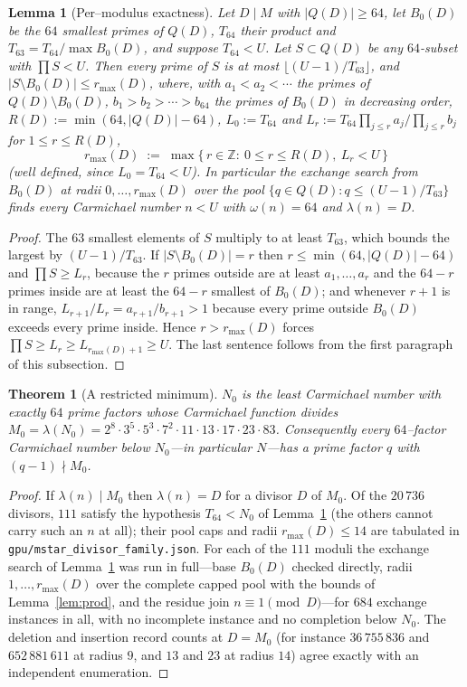 \documentclass[11pt]{article}
\newtheorem{theorem}{Theorem}
\newtheorem{lemma}{Lemma}
\theoremstyle{definition}
\newcommand{\code}[1]{\texttt{#1}}
\begin{document}
\begin{lemma}[Per--modulus exactness]\label{lem:exact}
Let $D\mid M$ with $|Q(D)|\ge 64$, let $B_0(D)$ be the $64$ smallest primes of $Q(D)$, $T_{64}$ their
product and $T_{63}=T_{64}/\max B_0(D)$, and suppose $T_{64}<U$. Let $S\subset Q(D)$ be any $64$-subset
with $\prod S<U$. Then every prime of $S$ is at most $\lfloor (U-1)/T_{63}\rfloor$, and
$|S\setminus B_0(D)|\le r_{\max}(D)$, where, with $a_1<a_2<\cdots$ the primes of $Q(D)\setminus B_0(D)$,
$b_1>b_2>\cdots>b_{64}$ the primes of $B_0(D)$ in decreasing order, $R(D):=\min(64,|Q(D)|-64)$,
$L_0:=T_{64}$ and $L_r:=T_{64}\prod_{j\le r}a_j/\prod_{j\le r}b_j$ for $1\le r\le R(D)$,
\[
  r_{\max}(D)\;:=\;\max\{\,r\in\mathbb Z:\ 0\le r\le R(D),\ L_r<U\,\}
\]
(well defined, since $L_0=T_{64}<U$). In particular the exchange search from $B_0(D)$ at radii $0,\dots,r_{\max}(D)$
over the pool $\{q\in Q(D): q\le (U-1)/T_{63}\}$ finds every Carmichael number $n<U$ with
$\omega(n)=64$ and $\lambda(n)=D$.
\end{lemma}
\begin{proof}
The $63$ smallest elements of $S$ multiply to at least $T_{63}$, which bounds the largest by
$(U-1)/T_{63}$. If $|S\setminus B_0(D)|=r$ then $r\le\min(64,|Q(D)|-64)$ and $\prod S\ge L_r$, because the
$r$ primes outside are at least $a_1,\dots,a_r$ and the $64-r$ primes inside are at least the
$64-r$ smallest of $B_0(D)$; and whenever $r+1$ is in range, $L_{r+1}/L_r=a_{r+1}/b_{r+1}>1$ because every
prime outside $B_0(D)$ exceeds every prime inside. Hence $r>r_{\max}(D)$ forces $\prod S\ge L_r\ge
L_{r_{\max}(D)+1}\ge U$. The last sentence follows from the first paragraph of this subsection.
\end{proof}

\begin{theorem}[A restricted minimum]\label{thm:restricted}
$N_0$ is the least Carmichael number with exactly $64$ prime factors whose Carmichael function divides
$M_0=\lambda(N_0)=2^8\cdot3^5\cdot5^3\cdot7^2\cdot11\cdot13\cdot17\cdot23\cdot83$. Consequently every
$64$--factor Carmichael number below $N_0$---in particular $N$---has a prime factor $q$ with
$(q-1)\nmid M_0$.
\end{theorem}
\begin{proof}
If $\lambda(n)\mid M_0$ then $\lambda(n)=D$ for a divisor $D$ of $M_0$. Of the $20\,736$ divisors,
$111$ satisfy the hypothesis $T_{64}<N_0$ of Lemma~\ref{lem:exact} (the others cannot carry such an
$n$ at all); their pool caps and radii $r_{\max}(D)\le 14$ are tabulated in
\code{gpu/mstar\_divisor\_family.json}. For each of the $111$ moduli the exchange search of
Lemma~\ref{lem:exact} was run in full---base $B_0(D)$ checked directly, radii $1,\dots,r_{\max}(D)$
over the complete capped pool with the bounds of Lemma~\ref{lem:prod}, and the residue join
$n\equiv1\pmod D$---for $684$ exchange instances in all, with no incomplete instance and no
completion below $N_0$. The deletion and insertion record counts at $D=M_0$ (for instance
$36\,755\,836$ and $652\,881\,611$ at radius $9$, and $13$ and $23$ at radius $14$) agree exactly with an
independent enumeration.
\end{proof}
\end{document}
